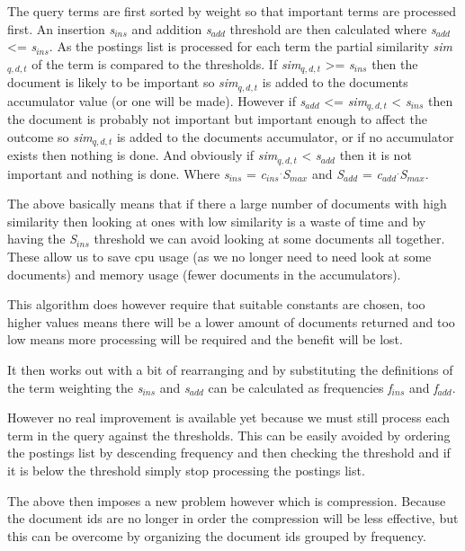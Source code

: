 \documentclass{acm_proc_article-sp}
\begin{document}
The query terms are first sorted by weight so that important terms are processed first. An insertion \emph{s$_{ins}$} and addition \emph{s$_{add}$} threshold are then calculated where \emph{s$_{add}$} <= \emph{s$_{ins}$}. As the postings list is processed for each term the partial similarity \emph{sim$_{q,d,t}$} of the term is compared to the thresholds. If \emph{sim$_{q,d,t}$} >= \emph{s$_{ins}$} then the document is likely to be important so \emph{sim$_{q,d,t}$} is added to the documents accumulator value (or one will be made). However if \emph{s$_{add}$} <= \emph{sim$_{q,d,t}$} < \emph{s$_{ins}$} then the document is probably not important but important enough to affect the outcome so \emph{sim$_{q,d,t}$} is added to the documents accumulator, or if no accumulator exists then nothing is done. And obviously if \emph{sim$_{q,d,t}$} < \emph{s$_{add}$} then it is not important and nothing is done. Where \emph{s$_{ins}$} = \emph{c$_{ins}$$^{.}$S$_{max}$} and \emph{S$_{add}$} = \emph{c$_{add}$$^{.}$S$_{max}$}.

The above basically means that if there a large number of documents with high similarity then looking at ones with low similarity is a waste of time and by having the \emph{S$_{ins}$} threshold we can avoid looking at some documents all together. These allow us to save cpu usage (as we no longer need to need look at some documents) and memory usage (fewer documents in the accumulators).

This algorithm does however require that suitable constants are chosen, too higher values means there will be a lower amount of documents returned and too low means more processing will be required and the benefit will be lost. 

It then works out with a bit of rearranging and by substituting the definitions of the term weighting the \emph{s$_{ins}$} and \emph{s$_{add}$} can be calculated as frequencies \emph{f$_{ins}$} and \emph{f$_{add}$}.

However no real improvement is available yet because we must still process each term in the query against the thresholds. This can be easily avoided by ordering the postings list by descending frequency and then checking the threshold and if it is below the threshold simply stop processing the postings list.

The above then imposes a new problem however which is compression. Because the document ids are no longer in order the compression will be less effective, but this can be overcome by organizing the document ids grouped by frequency.
\end{document}
